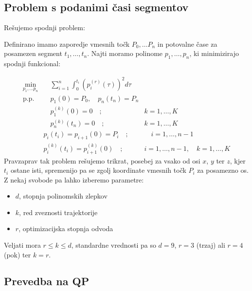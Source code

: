 \documentclass[mat2, tisk]{fmfdelo}
\begin{document}
\subsection{Problem s podanimi časi segmentov}
Rešujemo spodnji problem:

Definirano imamo zaporedje vmesnih točk $P_0, \ldots P_n$ in potovalne čase za posamezen segment $t_1, \ldots, t_n$. Najti moramo polinome $p_1, \ldots, p_n$, ki minimizirajo spodnji funkcional:

\begin{equation}
\label{eq:functional}
\begin{aligned}
    \min_{p_1, \ldots p_n}& \quad \sum_{i=1}^n \int_0^{t_i} (p_i^{(r)}(\tau))^2 d\tau \\
    \text{p.p.} & \quad p_1(0) = P_0, \quad p_n(t_n) = P_n& \\
    & \quad p^{(k)}_1(0) = 0 \quad ; \quad &k = 1, \ldots, K \\
     &\quad p^{(k)}_n(t_n) = 0 \quad ; \quad &k = 1, \ldots, K \\
     \quad &p_i(t_i) = p_{i+1}(0) = P_i \quad ;& \quad i = 1, \ldots , n-1 \\
     \quad &p_i^{(k)}(t_i) = p_{i+1}^{(k)}(0) \quad ; \quad &i = 1, \ldots, n-1,\quad k = 1, \ldots, K 
\end{aligned}
\end{equation}
Pravzaprav tak problem rešujemo trikrat, posebej za vsako od osi $x$, $y$ ter $z$, kjer $t_i$ ostane isti, spremenijo pa se zgolj koordinate vmesnih točk $P_i$ za posamezno os. Z nekaj svobode pa lahko izberemo parametre:
\begin{itemize}
    \item $d$, stopnja polinomskih zlepkov
    \item $k$, red zveznosti trajektorije
    \item $r$, optimizacijska stopnja odvoda
\end{itemize}
Veljati mora $r \leq k \leq d$, standardne vrednosti pa so $d = 9$, $r = 3$ (trzaj) ali $r = 4$ (pok) ter $k = r$.

\subsection{Prevedba na \acs{QP}}
\label{sec:prevedba}
\end{document}
